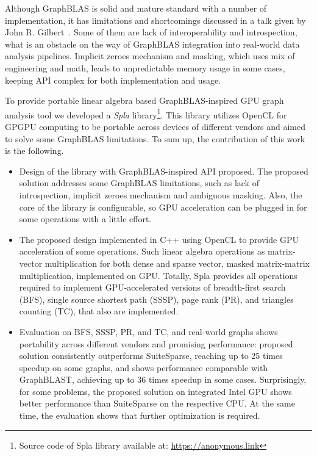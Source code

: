 Although GraphBLAS is solid and mature standard with a number of implementation, it has limitations and shortcomings discussed in a talk given by John R. Gilbert~\cite{talk:graphblas_did_wrong}. Some of them are lack of interoperability and introspection, what is an obstacle on the way of GraphBLAS integration into real-world data analysis pipelines. Implicit zeroes mechanism and masking, which uses mix of engineering and math, leads to unpredictable memory usage in some cases, keeping API complex for both implementation and usage.

To provide portable linear algebra based GraphBLAS-inspired GPU graph analysis tool we developed a \textit{Spla} library\footnote{Source code of Spla library available at: \url{https://anonymous.link}}.
This library utilizes OpenCL for GPGPU computing to be portable across devices of different vendors and aimed to solve some GraphBLAS limitations.
To sum up, the contribution of this work is the following.
\begin{itemize}
    \item Design of the library with GraphBLAS-inspired API proposed. The proposed solution addresses some GraphBLAS limitations, such as lack of introspection, implicit zeroes mechanism and ambiguous masking. Also, the core of the library is configurable, so GPU acceleration can be plugged in for some operations with a little effort.
    \item The proposed design implemented in C++ using OpenCL to provide GPU acceleration of some operations. Such linear algebra operations as matrix-vector multiplication for both dense and sparse vector, masked matrix-matrix multiplication, implemented on GPU. Totally, Spla provides all operations required to implement GPU-accelerated versions of breadth-first search (BFS), single source shortest path (SSSP), page rank (PR), and triangles counting (TC), that also are implemented.
    \item Evaluation on BFS, SSSP, PR, and TC, and real-world graphs shows portability across different vendors and promising performance: proposed solution consistently outperforms SuiteSparse, reaching up to 25 times speedup on some graphs, and shows performance comparable with GraphBLAST, achieving up to 36 times speedup in some cases. Surprisingly, for some problems, the proposed solution on integrated Intel GPU shows better performance than SuiteSparse on the respective CPU. At the same time, the evaluation shows that further optimization is required.
\end{itemize}
